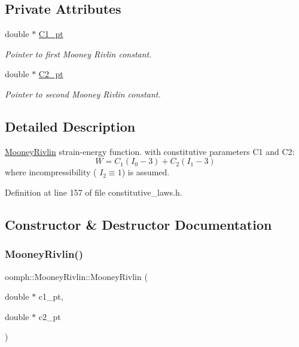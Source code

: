 \subsection*{Private Attributes}
\begin{DoxyCompactItemize}
\item 
double $\ast$ \hyperlink{classoomph_1_1MooneyRivlin_abbaf1eefb4ccf8a51224bd18e903449b}{C1\+\_\+pt}
\begin{DoxyCompactList}\small\item\em Pointer to first Mooney Rivlin constant. \end{DoxyCompactList}\item 
double $\ast$ \hyperlink{classoomph_1_1MooneyRivlin_a44b67554972b5659b5017598951be5fa}{C2\+\_\+pt}
\begin{DoxyCompactList}\small\item\em Pointer to second Mooney Rivlin constant. \end{DoxyCompactList}\end{DoxyCompactItemize}


\subsection{Detailed Description}
\hyperlink{classoomph_1_1MooneyRivlin}{Mooney\+Rivlin} strain-\/energy function. with constitutive parameters C1 and C2\+: \[ W = C_1 (I_0 - 3) + C_2 (I_1 - 3) \] where incompressibility ( $ I_2 \equiv 1$) is assumed. 

Definition at line 157 of file constitutive\+\_\+laws.\+h.



\subsection{Constructor \& Destructor Documentation}
\mbox{\label{classoomph_1_1MooneyRivlin_ac67b8747413e5e7cca8f0d4c42b8ecdc}} 
\subsubsection{\texorpdfstring{Mooney\+Rivlin()}{MooneyRivlin()}}
{\footnotesize\ttfamily oomph\+::\+Mooney\+Rivlin\+::\+Mooney\+Rivlin (\begin{DoxyParamCaption}\item[{double $\ast$}]{c1\+\_\+pt,  }\item[{double $\ast$}]{c2\+\_\+pt }\end{DoxyParamCaption})\hspace{0.3cm}{\ttfamily [inline]}}



